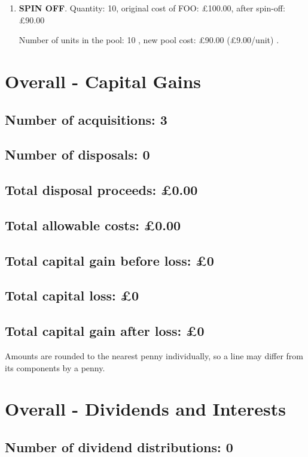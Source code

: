 \documentclass{article}
\begin{document}
\begin{enumerate}
\item \textbf{SPIN OFF}. Quantity: 10,
    original cost of FOO: £100.00, after spin-off: £90.00

    Number of units in the pool:
    10%
,
    new pool cost: £90.00
    (£9.00/unit)%
.

\end{enumerate}




\clearpage
\section*{Overall - Capital Gains}
\subsection*{Number of acquisitions: 3}
\subsection*{Number of disposals: 0}
\subsection*{Total disposal proceeds: £0.00}
\subsection*{Total allowable costs: £0.00}
\subsection*{Total capital gain before loss: £0}
\subsection*{Total capital loss: £0}
\subsection*{Total capital gain after loss: £0}
\vspace{1em}
Amounts are rounded to the nearest penny individually, so a line may differ from its components by a penny.
\vspace{2em}
\section*{Overall - Dividends and Interests}
\subsection*{Number of dividend distributions: 0}
\end{document}
